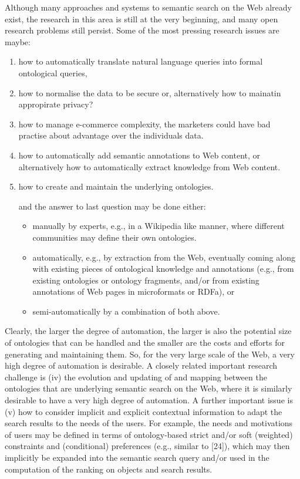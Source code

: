 \documentclass[12pt,a4]{article}
\begin{document}
Although many approaches and systems to semantic search on the Web already exist, the research in this area is still at the very beginning, and many open research problems still persist. Some of the most pressing research issues are maybe:
\begin{enumerate}
\item how to automatically translate natural language queries into formal ontological queries,
\item how to normalise the data to be secure or, alternatively how to mainatin appropirate privacy?
\item how to manage e-commerce complexity, the marketers could have bad practise about advantage over the individuals data.
\item how to automatically add semantic annotations to Web content, or alternatively how to automatically extract knowledge from Web content. 
\item how to create and maintain the underlying ontologies. 

and the answer to last question may be done either:
\begin{itemize}
\item manually by experts, e.g., in a Wikipedia like manner, where different communities may define their own ontologies.
\item automatically, e.g., by extraction from the Web, eventually coming along with existing pieces of ontological knowledge and annotations (e.g., from existing ontologies or ontology fragments, and/or from existing annotations of Web pages in microformats or RDFa), or
\item semi-automatically by a combination of both above. 
\end{itemize}
\end{enumerate}
Clearly, the larger the degree of automation, the larger is also the potential size of ontologies that can be handled and the smaller are the costs and efforts for generating and maintaining them. So, for the very large scale of the Web, a very high degree of automation is desirable. A closely related important research challenge is (iv) the evolution and updating of and mapping between the ontologies that are underlying semantic search on the Web, where it is similarly desirable to have a very high degree of automation. A further important issue is (v) how to consider implicit and explicit contextual information to adapt the search results to the needs of the users. For example, the needs and motivations of users may be defined in terms of ontology-based strict and/or soft (weighted) constraints and (conditional) preferences (e.g., similar to [24]), which may then implicitly be expanded into the semantic search query and/or used in the computation of the ranking on objects and search results.
\end{document}
